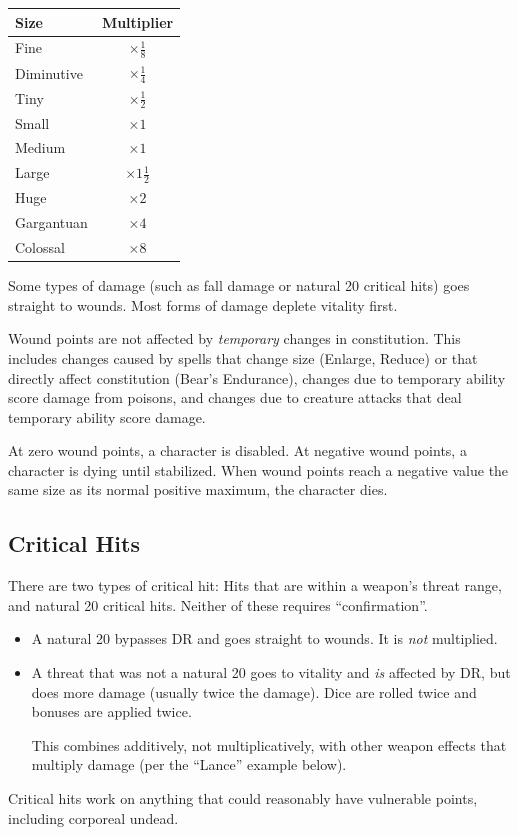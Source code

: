 \begin{tabular}{lc} \hline
\textbf{Size} & \textbf{Multiplier} \\ \hline
Fine & $\times \frac{1}{8}$ \\
Diminutive & $\times \frac{1}{4}$ \\
Tiny & $\times \frac{1}{2}$ \\
\hline
Small & $\times 1$ \\
Medium & $\times 1$ \\
Large & $\times 1\frac{1}{2}$ \\
\hline
Huge & $\times 2$ \\
Gargantuan & $\times 4$ \\
Colossal & $\times 8$ \\
\hline
\end{tabular}

Some types of damage (such as fall damage or natural 20 critical hits)
goes straight to wounds. Most forms of damage deplete vitality first.

Wound points are not affected by \textit{temporary} changes in constitution.
This includes changes caused by spells that change size (Enlarge, Reduce) or
that directly affect constitution (Bear's Endurance), changes due to
temporary ability score damage from poisons, and changes due to creature
attacks that deal temporary ability score damage.

At zero wound points, a character is disabled. At negative wound points, a
character is dying until stabilized. When wound points reach a negative
value the same size as its normal positive maximum, the character dies.

%
\subsection{Critical Hits}

There are two types of critical hit: Hits that are within a weapon's threat
range, and natural 20 critical hits. Neither of these requires
``confirmation''.
\begin{itemize}
\item A natural 20 bypasses DR and goes straight to wounds. It is \textit{not}
multiplied.
\item A threat that was not a natural 20 goes to vitality and \textit{is}
affected by DR, but does more damage (usually twice the damage). Dice are
rolled twice and bonuses are applied twice.

This combines additively, not multiplicatively, with other weapon effects
that multiply damage (per the ``Lance'' example below).
\end{itemize}
Critical hits work on anything that could reasonably have vulnerable
points, including corporeal undead.


